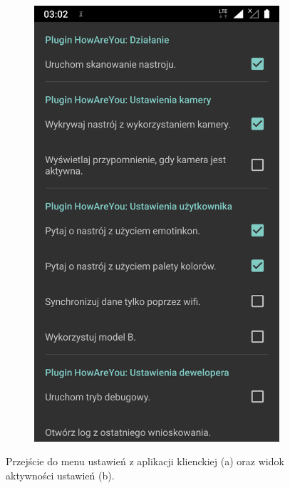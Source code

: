 \begin{figure}[H]
\begin{subfigure}{0.35\textwidth}
		\includegraphics[scale=0.13]{rozdzial3/Ustawienia_cz1.png}
		\subcaption{\label{subfigure_b}}
	\end{subfigure}
	\caption{ Przejście do menu ustawień z aplikacji klienckiej (a) oraz widok aktywności ustawień (b).}
\end{figure}

